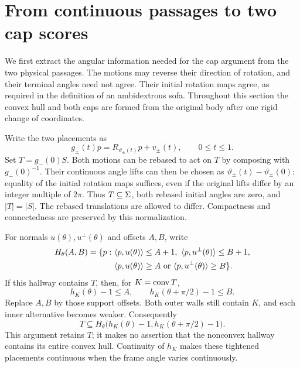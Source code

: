 \section{From continuous passages to two cap scores}\label{sec:reduction}

We first extract the angular information needed for the cap argument
from the two physical passages. The motions may reverse their direction
of rotation, and their terminal angles need not agree. Their initial
rotation maps agree, as required in the definition of an ambidextrous
sofa. Throughout this section the convex hull and both caps are formed
from the original body after one rigid change of coordinates.

Write the two placements as
\[
 g_\pm(t)p=R_{\vartheta_\pm(t)}p+v_\pm(t),\qquad 0\le t\le1.
\]
Set $T=g_-(0)S$. Both motions can be rebased to act on $T$ by
composing with $g_-(0)^{-1}$. Their continuous angle lifts can then be
chosen as $\vartheta_\pm(t)-\vartheta_\pm(0)$: equality of the initial
rotation maps suffices, even if the original lifts differ by an integer
multiple of $2\pi$. Thus $T\subseteq\Sigma$, both rebased initial angles
are zero, and $|T|=|S|$. The rebased translations are allowed to differ.
Compactness and connectedness are preserved by this normalization.


For normals $u(\theta),u^\perp(\theta)$ and offsets $A,B$, write
\begin{equation}\label{eq:frame-hall}
 \begin{split}
 H_\theta(A,B)=\{p:\ &\langle p,u(\theta)\rangle\le A+1,
                  \ \langle p,u^\perp(\theta)\rangle\le B+1,\\
                  &\langle p,u(\theta)\rangle\ge A\ \text{or}\
                   \langle p,u^\perp(\theta)\rangle\ge B\}.
 \end{split}
\end{equation}
If this hallway contains $T$, then, for $K=\operatorname{conv} T$,
\[
 h_K(\theta)-1\le A,\qquad h_K(\theta+\pi/2)-1\le B.
\]
Replace $A,B$ by those support offsets. Both outer walls still
contain $K$, and each inner alternative becomes weaker. Consequently
\begin{equation}\label{eq:support-tightening}
 T\subseteq H_\theta\bigl(h_K(\theta)-1,h_K(\theta+\pi/2)-1\bigr).
\end{equation}
This argument retains $T$; it makes no assertion that the nonconvex
hallway contains its entire convex hull.
Continuity of $h_K$ makes these tightened placements continuous when
the frame angle varies continuously.

